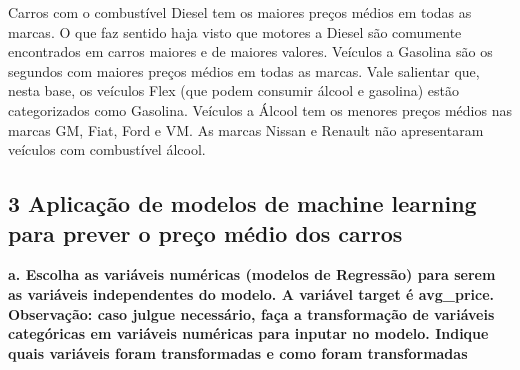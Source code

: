 Carros com o combustível Diesel tem os maiores preços médios em todas as marcas. O que faz sentido haja visto que motores a Diesel são comumente encontrados em carros maiores e de maiores valores. Veículos a Gasolina são os segundos com maiores preços médios em todas as marcas. Vale salientar que, nesta base, os veículos Flex (que podem consumir álcool e gasolina) estão categorizados como Gasolina.  Veículos a Álcool tem os menores preços médios nas marcas GM, Fiat, Ford e VM. As marcas Nissan e Renault não apresentaram veículos com combustível álcool.


\subsection*{\textbf{3 Aplicação de modelos de machine learning para prever o preço médio dos carros}}

\begin{adjustwidth}{1em}{}
\textbf{a. Escolha as variáveis \textbf{numéricas} (modelos de Regressão) para serem as variáveis independentes do modelo. A
variável target é \textbf{avg\_price. Observação:} caso julgue necessário, faça a transformação de variáveis
categóricas em variáveis numéricas para inputar no modelo. Indique \textbf{quais variáveis} foram transformadas e
\textbf{como} foram transformadas}
\end{adjustwidth}

